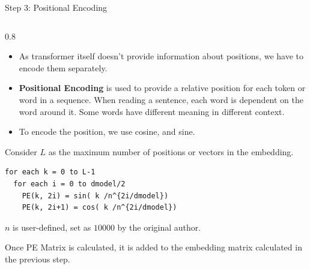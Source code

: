 \documentclass[aspectratio=169,xcolor=dvipsnames,svgnames,x11names,fleqn]{beamer}
\begin{document}
\begin{frame}[fragile]{Step 3: Positional Encoding}
\begin{columns}[T]
\begin{column}{0.8\textwidth}
\begin{itemize}
       \item  As transformer itself doesn't provide information about positions, we have to encode them separately.
       
       \item  \textbf{Positional Encoding} is used to provide a relative position for each token or word in a sequence. When reading a sentence, each word is dependent on the word around it. Some words have different meaning in different context.
       
       \item  To encode the position, we use cosine, and sine.
        
       
\end{itemize}       
        
       

       
        

        Consider $L$ as the maximum number of positions or vectors in the embedding.

        

        \begin{tcolorbox}[colback=black!5, colframe=black!50, arc=1mm, boxrule=0.5pt, left=2pt, right=2pt, top=2pt, bottom=2pt]
        \tiny\begin{verbatim}
for each k = 0 to L-1
  for each i = 0 to dmodel/2
    PE(k, 2i) = sin( k /n^{2i/dmodel})
    PE(k, 2i+1) = cos( k /n^{2i/dmodel}) \end{verbatim}
        \end{tcolorbox}
        
        $n$ is user-defined, set as $10000$ by the original author.
        
        Once PE Matrix is calculated, it is added to the embedding matrix calculated in the previous step.
    \end{column}
\end{columns}
\end{frame}
\end{document}
